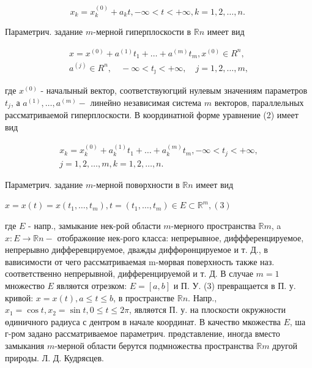 \documentclass[10pt]{article}
\begin{document}
\[

x_{k}=x_{k}^{(0)}+a_{k} t,-\infty<t<+\infty, k=1,2, \ldots, n \text {. }

\]



Параметрич. задание $m$-мерной гиперплоскости в $\mathbb{R} n$ имеет вид



\[

\begin{gathered}

x=x^{(0)}+a^{(1)} t_{1}+\ldots+a^{(m)} t_{m}, x^{(0)} \in R^{n}, \\

a^{(j)} \in R^{n}, \quad-\infty<t_{\jmath}<+\infty, \quad j=1,2, \ldots, m,

\end{gathered}

\]



где $x^{(0)}$ - началыный вектор, соответствуюгций нулевым значениям параметров $t_{j}$, а $a^{(1)}, \ldots, a^{(m)}-$ линейно независимая система $m$ векторов, параллельных рассматриваемой гиперплоскости. В координатной форме уравнение (2) имеет вид



\[

\begin{gathered}

x_{k}=x_{k}^{(0)}+a_{k}^{(1)} t_{1}+\ldots+a_{k}^{(m)} t_{m},-\infty<t_{j}<+\infty, \\

j=1,2, \ldots, m, k=1,2, \ldots, n .

\end{gathered}

\]



Параметрич. задание $m$-мерной повөрхности в $\mathbb{R} n$ имеет вид



$x=x(t)=x\left(t_{1}, \ldots, t_{m}\right), t=\left(t_{1}, \ldots, t_{m}\right) \in E \subset \mathbb{R}^{m},(3)$



где $E$ - напр., замыкание нек-рой области $m$-мерного пространства $\mathbb{R} m$, a $x: E \rightarrow \mathbb{R} n-$ отображөние нек-рого класса: непрерывное, диффференцируемое, непрерывно дифферевцируемое, дважды диффөрөнцируемое и т. Д., в вависимости от чего рассматриваемая m-мөрвая поверхность также наз. соответственно непрерывной, дифференцируемой и т. Д. В случае $m=1$ множество $E$ являөтся отрезком: $E=[a, b]$ и П. У. (3) превращается в П. у. кривой: $x=x(t), a \leqslant t \leqslant b$, в пространстве $\mathbb{R} n$. Напр., $x_{1}=\cos t, x_{2}=\sin t, 0 \leqslant t \leqslant 2 \pi$, являөтся П. у. на плоскости окружности өдиничного радиуса с дентром в начале координат. В качество мкожества $E$, ша г-ром задано рассматриваемое параметрич. прөдставление, иногда вместо замыкания $m$-мерной области берутся подмножества пространства $\mathbb{R} m$ другой природы. Л. Д. Кудряєцев.
\end{document}
